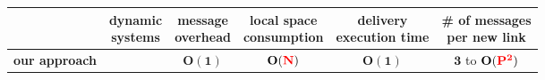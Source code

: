 \scriptsize

\begin{tabularx}{0.99\columnwidth}{@{}Xccccc@{}}
  & \makecell{dynamic\\systems} & \makecell{message\\overhead} & \makecell{local space\\consumption} &  \makecell{delivery\\execution time} & \makecell{\# of messages\\per new link} \\%
  \hline\hline
  \textbf{our approach} & \textbf{\YES{\cmark}} & $\mathbf{O(1)}$ & $\mathbf{O(\textcolor{red}{N})}$ & $\mathbf{O(1)}$ & $\mathbf{3}$ to $\mathbf{O(\textcolor{red}{P^2})}$ \\ 
\end{tabularx}

